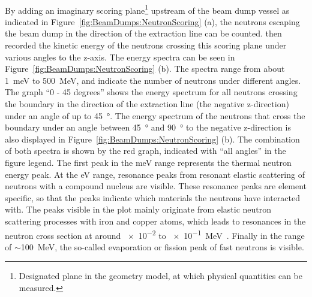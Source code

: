 \\By adding an imaginary scoring plane\footnote{Designated plane in the \fluka geometry model, at which physical quantities can be measured.} upstream of the beam dump vessel as indicated in Figure~\ref{fig:BeamDumps:NeutronScoring} (a), the neutrons escaping the beam dump in the direction of the extraction line can be counted.
\fluka then recorded the kinetic energy of the neutrons crossing this scoring plane under various angles to the z-axis.
The energy spectra can be seen in Figure~\ref{fig:BeamDumps:NeutronScoring} (b).
The spectra range from about \SI{1}{\meV} to \SI{500}{\MeV}, and indicate the number of neutrons under different angles. 
The graph ``0 - 45 degrees'' shows the energy spectrum for all neutrons crossing the boundary in the direction of the extraction line (the negative z-direction) under an angle of up to \SI{45}{\degree}.
The energy spectrum of the neutrons that cross the boundary under an angle between \SI{45}{\degree} and \SI{90}{\degree} to the negative z-direction is also displayed in Figure~\ref{fig:BeamDumps:NeutronScoring} (b).
The combination of both spectra is shown by the red graph, indicated with ``all angles'' in the figure legend.
The first peak in the meV range represents the thermal neutron energy peak.
At the eV range, resonance peaks from resonant elastic scattering of neutrons with a compound nucleus are visible.
These resonance peaks are element specific, so that the peaks indicate which materials the neutrons have interacted with.
The peaks visible in the plot mainly originate from elastic neutron scattering processes with iron and copper atoms, which leads to resonances in the neutron cross section at around \num{e-2} to \SI{e-1}{\MeV}~\cite{neutron_resonances,neutron_resonances2}.
Finally in the range of $\sim$\SI{100}{\MeV}, the so-called evaporation or fission peak of fast neutrons is visible.

